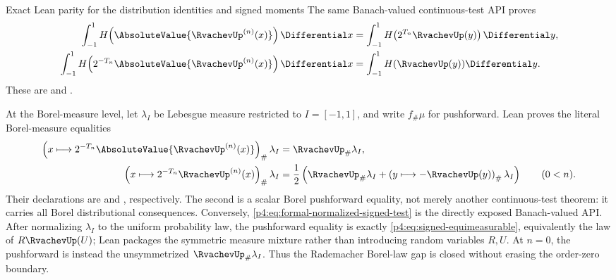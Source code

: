 \documentclass[11pt,oneside]{article}
\theoremstyle{definition}
\theoremstyle{remark}
\begin{document}
\begin{statusbox}{Exact Lean parity for the distribution identities and signed moments}
The same Banach-valued continuous-test API proves
\begin{align}
 \int_{-1}^{1}H\!\left(\AbsoluteValue{\RvachevUp^{(n)}(x)}\right)\Differential x
 &=
 \int_{-1}^{1}H\!\left(2^{T_n}\RvachevUp(y)\right)\Differential y,
 \label{p4:eq:formal-absolute-test}\\
 \int_{-1}^{1}H\!\left(2^{-T_n}\AbsoluteValue{\RvachevUp^{(n)}(x)}\right)\Differential x
 &=
 \int_{-1}^{1}H(\RvachevUp(y))\Differential y.
 \label{p4:eq:formal-normalized-absolute-test}
\end{align}
These are  and
.

At the Borel-measure level, let
\(\lambda_I\) be Lebesgue measure restricted to \(I=[-1,1]\), and write
\(f_{\#}\mu\) for pushforward.  Lean proves the literal Borel-measure equalities
\begin{align}
 \left(x\longmapsto2^{-T_n}\AbsoluteValue{\RvachevUp^{(n)}(x)}\right)_{\#}\lambda_I
 &=\RvachevUp_{\#}\lambda_I,
                                      \label{p4:eq:formal-absolute-pushforward}\\
 \left(x\longmapsto2^{-T_n}\RvachevUp^{(n)}(x)\right)_{\#}\lambda_I
 &=\frac12\left(
   \RvachevUp_{\#}\lambda_I+
   \left(y\longmapsto-\RvachevUp(y)\right)_{\#}\lambda_I\right)
   \qquad(0<n).                     \label{p4:eq:formal-signed-pushforward}
\end{align}
Their declarations are
 and
, respectively.  The second is a
scalar Borel pushforward equality, not merely another continuous-test theorem: it carries
all Borel distributional consequences.  Conversely,
\eqref{p4:eq:formal-normalized-signed-test} is the directly exposed Banach-valued API.
After normalizing \(\lambda_I\) to the uniform probability law, the pushforward equality is
exactly \eqref{p4:eq:signed-equimeasurable}, equivalently the law of
\(R\RvachevUp(U)\); Lean packages the symmetric measure mixture rather than introducing
random variables \(R,U\).  At \(n=0\), the pushforward is instead the unsymmetrized
\(\RvachevUp_{\#}\lambda_I\).  Thus the Rademacher Borel-law gap is closed without erasing
the order-zero boundary.
\end{statusbox}
\end{document}
